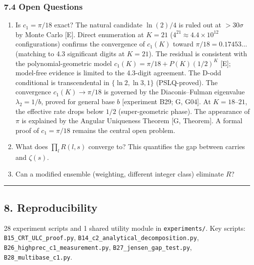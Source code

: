 \documentclass[
  11pt,
]{article}
\begin{document}
\subsubsection{7.4 Open Questions}\label{open-questions}

\begin{enumerate}
\def\labelenumi{\arabic{enumi}.}
\item
  Is \(c_1 = \pi/18\) exact? The natural candidate \(\ln(2)/4\) is ruled out at
  \(> 30\sigma\) by Monte Carlo {[}E{]}. Direct enumeration at \(K = 21\)
  (\(4^{21} \approx 4.4 \times 10^{12}\) configurations) confirms the
  convergence of \(c_1(K)\) toward \(\pi/18 = 0.17453\ldots\) (matching to 4.3
  significant digits at \(K = 21\)). The residual is consistent with the
  polynomial-geometric model \(c_1(K) = \pi/18 + P(K)(1/2)^K\) {[}E{]};
  model-free evidence is limited to the 4.3-digit agreement. The D-odd
  conditional is transcendental in \(\lbrace{}\ln 2, \ln 3, 1\rbrace{}\)
  (PSLQ-proved). The convergence \(c_1(K) \to \pi/18\) is governed by the
  Diaconis--Fulman eigenvalue \(\lambda_2 = 1/b\), proved for general base \(b\)
  {[}experiment B29; G, G04{]}. At \(K = 18\)--\(21\), the effective rate drops
  below \(1/2\) (super-geometric phase). The appearance of \(\pi\) is explained
  by the Angular Uniqueness Theorem {[}G, Theorem{]}. A formal proof of
  \(c_1 = \pi/18\) remains the central open problem.
\item
  What does \(\prod_l R(l,s)\) converge to? This quantifies the gap between
  carries and \(\zeta(s)\).
\item
  Can a modified ensemble (weighting, different integer class) eliminate \(R\)?
\end{enumerate}

\begin{center}\rule{0.5\linewidth}{0.5pt}\end{center}

\newpage

\subsection{8. Reproducibility}\label{reproducibility}

28 experiment scripts and 1 shared utility module in \texttt{experiments/}. Key
scripts: \texttt{B15\_CRT\_ULC\_proof.py},
\texttt{B14\_c2\_analytical\_decomposition.py},
\texttt{B26\_highprec\_c1\_measurement.py}, \texttt{B27\_jensen\_gap\_test.py},
\texttt{B28\_multibase\_c1.py}.
\end{document}
